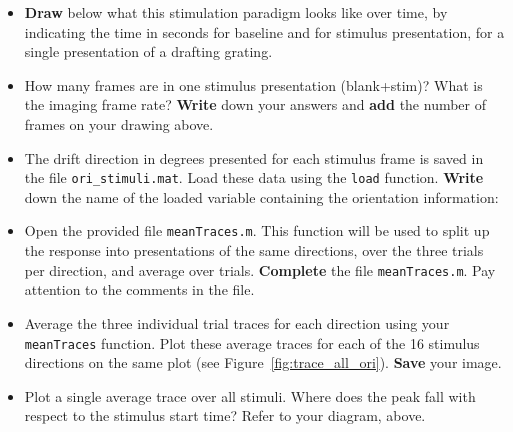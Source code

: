 \documentclass[paper=a4, fontsize=11pt]{article} %
\numberwithin{equation}{section} %
\numberwithin{figure}{section} %
\numberwithin{table}{section} %
\begin{document}
\begin{itemize}
\item \textbf{Draw} below what this stimulation paradigm looks like over time, by indicating the time in seconds for baseline and for stimulus presentation, for a single presentation of a drafting grating.
  \vspace{3in}
\item How many frames are in one stimulus presentation (blank+stim)? What is the imaging frame rate? \textbf{Write} down your answers and \textbf{add} the number of frames on your drawing above.
\item The drift direction in degrees presented for each stimulus frame is saved in the file \texttt{ori\_stimuli.mat}.
  Load these data using the \texttt{load} function. \textbf{Write} down the name of the loaded variable containing the orientation information:
\item Open the provided file \texttt{meanTraces.m}. This function will be used to split up the response into presentations of the same directions, over the three trials per direction, and average over trials. \textbf{Complete} the file \texttt{meanTraces.m}. Pay attention to the comments in the file.
\item Average the three individual trial traces for each direction using your \texttt{meanTraces} function. Plot these average traces for each of the 16 stimulus directions on the same plot (see Figure~\ref{fig:trace_all_ori}). \textbf{Save} your image.
\item Plot a single average trace over all stimuli. Where does the peak fall with respect to the stimulus start time? Refer to your diagram, above.
\end{itemize}
\end{document}
